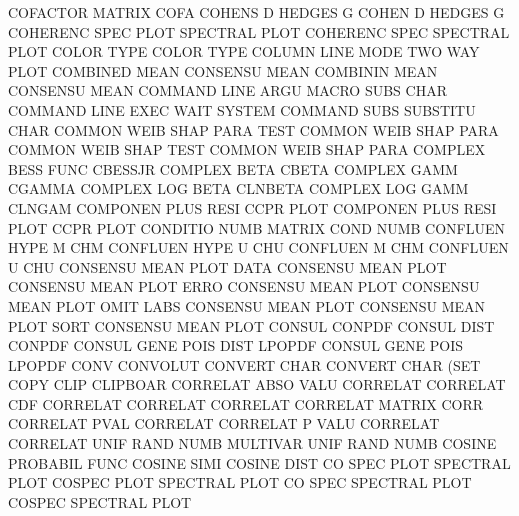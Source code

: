 COFACTOR                                MATRIX   COFA
COHENS   D                              HEDGES   G
COHEN    D                              HEDGES   G
COHERENC SPEC PLOT                      SPECTRAL PLOT
COHERENC SPEC                           SPECTRAL PLOT
COLOR    TYPE                           COLOR    TYPE
COLUMN   LINE MODE                      TWO      WAY  PLOT
COMBINED MEAN                           CONSENSU MEAN
COMBININ MEAN                           CONSENSU MEAN
COMMAND  LINE ARGU                      MACRO    SUBS CHAR
COMMAND  LINE EXEC WAIT                 SYSTEM
COMMAND  SUBS                           SUBSTITU CHAR
COMMON   WEIB SHAP PARA TEST            COMMON   WEIB SHAP PARA
COMMON   WEIB SHAP TEST                 COMMON   WEIB SHAP PARA
COMPLEX  BESS FUNC                      CBESSJR
COMPLEX  BETA                           CBETA
COMPLEX  GAMM                           CGAMMA
COMPLEX  LOG BETA                       CLNBETA
COMPLEX  LOG GAMM                       CLNGAM
COMPONEN PLUS RESI                      CCPR     PLOT
COMPONEN PLUS RESI PLOT                 CCPR     PLOT
CONDITIO NUMB                           MATRIX   COND NUMB
CONFLUEN HYPE M                         CHM
CONFLUEN HYPE U                         CHU
CONFLUEN M                              CHM
CONFLUEN U                              CHU
CONSENSU MEAN PLOT DATA                 CONSENSU MEAN PLOT
CONSENSU MEAN PLOT ERRO                 CONSENSU MEAN PLOT
CONSENSU MEAN PLOT OMIT LABS            CONSENSU MEAN PLOT
CONSENSU MEAN PLOT SORT                 CONSENSU MEAN PLOT
CONSUL                                  CONPDF
CONSUL   DIST                           CONPDF
CONSUL   GENE POIS DIST                 LPOPDF
CONSUL   GENE POIS                      LPOPDF
CONV                                    CONVOLUT
CONVERT  CHAR                           CONVERT  CHAR (SET
COPY     CLIP                           CLIPBOAR
CORRELAT ABSO VALU                      CORRELAT
CORRELAT CDF                            CORRELAT
CORRELAT                                CORRELAT
CORRELAT                                MATRIX   CORR
CORRELAT PVAL                           CORRELAT
CORRELAT P    VALU                      CORRELAT
CORRELAT UNIF RAND NUMB                 MULTIVAR UNIF RAND NUMB
COSINE                                  PROBABIL FUNC
COSINE   SIMI                           COSINE   DIST
CO       SPEC PLOT                      SPECTRAL PLOT
COSPEC   PLOT                           SPECTRAL PLOT
CO       SPEC                           SPECTRAL PLOT
COSPEC                                  SPECTRAL PLOT
